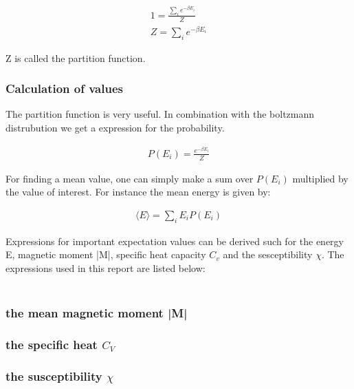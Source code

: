 \begin{align*}
	1 = \frac{\sum_{i} e^{-\beta E_i}}{Z}
	\\
	Z = \sum_{i} e^{-\beta E_i}
\end{align*}

Z is called the partition function. 

\subsubsection{Calculation of values}

The partition function is very useful. In combination with the boltzmann distrubution we get a expression for the probability. 

\begin{align*}
	P(E_i) = \frac{e^{-\beta E_i}}{Z}
\end{align*}

For finding a mean value, one can simply make a sum over $P(E_i)$ multiplied by the value of interest. For instance the mean energy is given by: 

\begin{align*}
	\langle E \rangle = \sum_i E_i P(E_i)
\end{align*}

Expressions for important expectation values can be derived such for the energy E, magnetic moment |M|, specific heat capacity $C_v$ and the sesceptibility $\chi$. The expressions used in this report are listed below\cite{compphys}:

\begin{align*}

\end{align*}

\subsubsection{the mean magnetic moment |M|}

\subsubsection{the specific heat $C_V$}

\subsubsection{the susceptibility $\chi$}



















